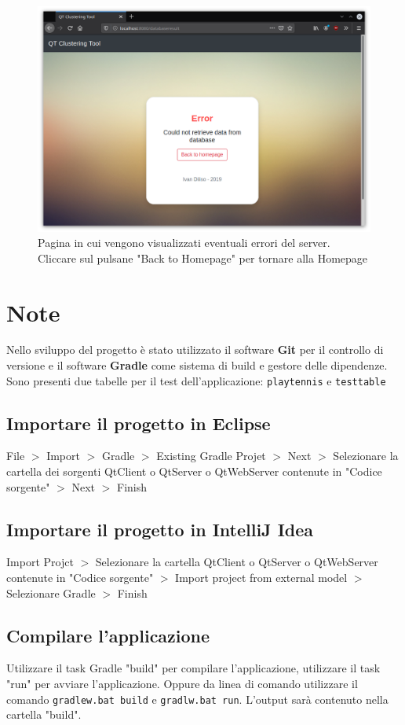 \documentclass{article}
\begin{document}
    \begin{figure}[H]
        \includegraphics[scale=0.4]{ADDON8}
        \caption{Pagina in cui vengono visualizzati eventuali errori del 
        server. Cliccare sul pulsane "Back to Homepage" per tornare alla 
        Homepage}   
        \label{fig:12}
    \end{figure} 


    \section{Note}
    Nello sviluppo del progetto è stato utilizzato il software 
    \textbf{Git} per il controllo di versione e il software 
    \textbf{Gradle} come sistema di build e gestore delle dipendenze.
    Sono presenti due tabelle per il test dell'applicazione: \verb|playtennis| 
    e \verb|testtable|
        \subsection{Importare il progetto in Eclipse}
        File $>$ Import $>$ Gradle $>$ Existing Gradle Projet $>$ Next $>$
        Selezionare la cartella dei sorgenti QtClient o QtServer o QtWebServer 
        contenute in "Codice sorgente"
        $>$ Next $>$
        Finish
        \subsection{Importare il progetto in IntelliJ  Idea}
        Import Projct $>$
         Selezionare la cartella  QtClient o QtServer o QtWebServer 
         contenute in "Codice sorgente"
         $>$
        Import project from external model $>$ Selezionare Gradle $>$ Finish 

        \subsection{Compilare l'applicazione}
        Utilizzare il task Gradle "build" per compilare l'applicazione, 
        utilizzare il task "run" per avviare l'applicazione. Oppure da linea 
        di comando utilizzare
        il comando \verb|gradlew.bat build| e \verb|gradlw.bat run|. 
        L'output sarà contenuto nella cartella "build".
\end{document}
